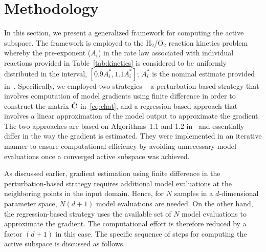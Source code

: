 \section{Methodology}
\label{sec:method}

In this section, we present a generalized framework for computing the
active subspace. The framework is employed to the H$_2$/O$_2$ reaction kinetics
problem whereby the 
pre-exponent ($A_i$) in the rate law associated with individual reactions provided in
Table~\ref{tab:kinetics} is considered to be uniformly
distributed in the interval, $[0.9A_i^\ast, 1.1A_i^\ast]$; $A_i^\ast$ is the nominal
estimate provided in~\cite{Yetter:1991}.
Specifically, we employed two strategies --
a perturbation-based strategy that involves computation of model
gradients using finite difference in order to construct the matrix $\hat{\mathbf{{C}}}$
in~\eqref{eq:chat}, and a regression-based approach 
that involves a linear approximation of
the model output to approximate the gradient. 
The two approaches are based on Algorithms~1.1 and 1.2 in~\cite{Constantine:2015} and
essentially differ in the way the gradient is estimated. They were implemented in an
iterative manner to ensure computational efficiency by avoiding 
unnecessary model evaluations once a converged active subspace
was achieved. 


As discussed earlier, gradient estimation using finite difference in the 
perturbation-based strategy requires additional model evaluations at the
neighboring points in the input domain. 
Hence, for $N$ samples in a $d$-dimensional parameter space, $N(d+1)$
model evaluations are needed. On the other hand, the regression-based
strategy uses the available set of $N$ model evaluations to approximate
the gradient. The computational effort is therefore 
reduced by a factor $(d+1)$ in this case. The specific sequence of steps
for computing the active subspace is discussed as follows.   


